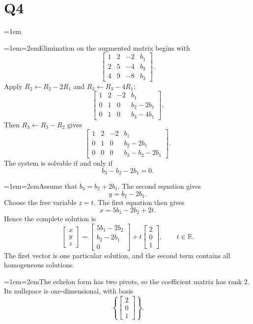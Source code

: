 \documentclass[11pt]{article}
\newcommand{\solutionquestion}[1]{\par\leftskip=0pt\section*{Q#1}\leftskip=1em}
\newcommand{\solutionpart}[1]{\par\smallskip\leftskip=1em\noindent\hangindent=2em\hangafter=1\makebox[1.5em][l]{\textbf{(#1)}}\hspace{0.5em}\ignorespaces}
\begin{document}
\solutionquestion{4}
\solutionpart{i}Elimination on the augmented matrix begins with
\[
\begin{bmatrix}
1&2&-2&b_1\\
2&5&-4&b_2\\
4&9&-8&b_3
\end{bmatrix}.
\]
Apply $R_2\leftarrow R_2-2R_1$ and $R_3\leftarrow R_3-4R_1$:
\[
\begin{bmatrix}
1&2&-2&b_1\\
0&1&0&b_2-2b_1\\
0&1&0&b_3-4b_1
\end{bmatrix}.
\]
Then $R_3\leftarrow R_3-R_2$ gives
\[
\begin{bmatrix}
1&2&-2&b_1\\
0&1&0&b_2-2b_1\\
0&0&0&b_3-b_2-2b_1
\end{bmatrix}.
\]
The system is solvable if and only if
\[
b_3-b_2-2b_1=0.
\]

\solutionpart{ii}Assume that $b_3=b_2+2b_1$. The second equation gives
\[
y=b_2-2b_1.
\]
Choose the free variable $z=t$. The first equation then gives
\[
x=5b_1-2b_2+2t.
\]
Hence the complete solution is
\[
\begin{bmatrix}x\\y\\z\end{bmatrix}
=\begin{bmatrix}5b_1-2b_2\\b_2-2b_1\\0\end{bmatrix}
+t\begin{bmatrix}2\\0\\1\end{bmatrix},
\qquad t\in\mathbb R.
\]
The first vector is one particular solution, and the second term contains all homogeneous solutions.

\solutionpart{iii}The echelon form has two pivots, so the coefficient matrix has rank $2$. Its nullspace is one-dimensional, with basis
\[
\left\{\begin{bmatrix}2\\0\\1\end{bmatrix}\right\}.
\]
\end{document}
